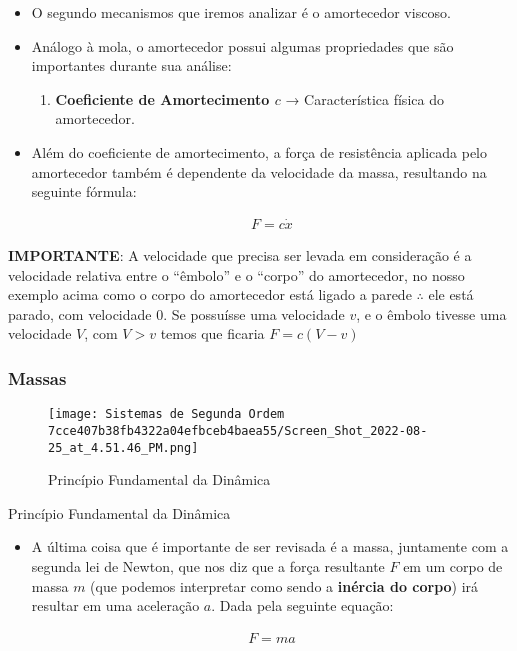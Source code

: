 \documentclass[]{article}
\providecommand{\tightlist}{%
  \setlength{\itemsep}{0pt}\setlength{\parskip}{0pt}}
\begin{document}
  \begin{itemize}
  \item
    O segundo mecanismos que iremos analizar é o amortecedor viscoso.
  \item
    Análogo à mola, o amortecedor possui algumas propriedades que são
    importantes durante sua análise:

    \begin{enumerate}
    \def\labelenumi{\arabic{enumi}.}
    \tightlist
    \item
      \textbf{Coeficiente de Amortecimento \(c\)} → Característica física
      do amortecedor.
    \end{enumerate}
  \item
    Além do coeficiente de amortecimento, a força de resistência aplicada
    pelo amortecedor também é dependente da velocidade da massa,
    resultando na seguinte fórmula:

    \[
      \begin{align}
      F = c\dot x
      \end{align}
      \]
  \end{itemize}

  \textbf{IMPORTANTE}: A velocidade que precisa ser levada em consideração
  é a velocidade relativa entre o ``êmbolo'' e o ``corpo'' do amortecedor,
  no nosso exemplo acima como o corpo do amortecedor está ligado a parede
  \(\therefore\) ele está parado, com velocidade 0. Se possuísse uma
  velocidade \(v\), e o êmbolo tivesse uma velocidade \(V\), com \(V > v\)
  temos que ficaria \(F = c(V-v)\)

  \hypertarget{massas}{%
  \subsubsection{Massas}\label{massas}}

  \begin{figure}
  \centering
  \texttt{[image: Sistemas de Segunda Ordem 7cce407b38fb4322a04efbceb4baea55/Screen\_Shot\_2022-08-25\_at\_4.51.46\_PM.png]}
  \caption{Princípio Fundamental da Dinâmica}
  \end{figure}

  Princípio Fundamental da Dinâmica

  \begin{itemize}
  \item
    A última coisa que é importante de ser revisada é a massa, juntamente
    com a segunda lei de Newton, que nos diz que a força resultante \(F\)
    em um corpo de massa \(m\) (que podemos interpretar como sendo a
    \textbf{inércia do corpo}) irá resultar em uma aceleração \(a\). Dada
    pela seguinte equação:

    \[
      \begin{align}
      F = ma
      \end{align}
      \]
  \end{itemize}
\end{document}
